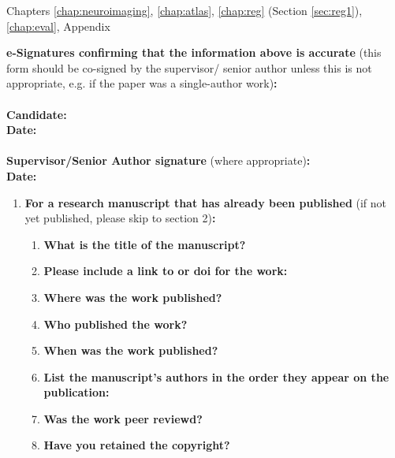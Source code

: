 {\begin{enumerate}[leftmargin=*,label={\bfseries\arabic*.}]
Chapters \ref{chap:neuroimaging}, \ref{chap:atlas}, \ref{chap:reg} (Section \ref{sec:reg1}), \ref{chap:eval}, Appendix
\end{enumerate}

\textbf{e-Signatures confirming that the information above is accurate}
(this form should be co-signed by the supervisor/ senior author unless this is not appropriate, e.g. if the paper was a single-author work)\textbf{:}\\
\textbf{}\\
\textbf{Candidate:}\\
\textbf{Date:}\\
\textbf{}\\
\textbf{Supervisor/Senior Author signature} (where appropriate)\textbf{:}\\
\textbf{Date:}
%

\newpage
\begin{enumerate}[leftmargin=*,label={\bfseries\arabic*.}]\itemsep0em
	\item \textbf{For a research manuscript that has already been published} (if not yet published, please skip to section 2)\textbf{:}
	\begin{enumerate}[label={\alph*)}]\itemsep0em
	\item \textbf{What is the title of the manuscript?}

	\item \textbf{Please include a link to or doi for the work:}

	\item \textbf{Where was the work published?}

	\item \textbf{Who published the work?}

	\item \textbf{When was the work published?}

	\item \textbf{List the manuscript's authors in the order they appear on the publication:}

	\item \textbf{Was the work peer reviewd?}

	\item \textbf{Have you retained the copyright?}


\end{enumerate}
\end{enumerate}}
